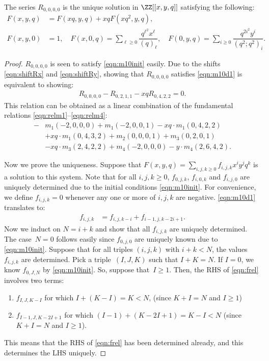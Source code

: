 \begin{thm}
The series $R_{0,0,0,0}$ is the unique solution in $\ZZ[[x,y,q]]$ satisfying
the following:
\begin{align}
F(x,y,q) &= F(xq,y,q) + xqF\left(xq^2,y,q\right) \label{eqn:m10d1},\\
F(x,y,0) &= 1,\quad 
F(x,0,q) = \sum_{\ell\geq 0}\dfrac{q^{\ell^2}x^\ell}{(q)_\ell},\quad 
F(0,y,q) = \sum_{i\geq 0}\dfrac{q^{2i^2}y^i}{(q^2;q^2)_i}. \label{eqn:m10init}
\end{align}
\end{thm}
\begin{proof}
$R_{0,0,0,0}$ is seen to satisfy \eqref{eqn:m10init} easily.
Due to the shifts \eqref{eqn:shiftRx} and \eqref{eqn:shiftRy}, showing that $R_{0,0,0,0}$ satisfies
\eqref{eqn:m10d1} is equivalent to showing:
\begin{align}
R_{0,0,0,0} - R_{0,2,1,1} - xqR_{0,4,2,2} = 0.
\end{align}
This relation can be obtained as a linear combination of the fundamental relations \eqref{eqn:relm1}--\eqref{eqn:relm4}:
\begin{align}
-&m_1(-2,0,0,0)+m_1(-2,0,0,1)-xq\cdot m_1(0,4,2,2)
\nonumber\\
&+xq\cdot m_1(0,4,3,2)+m_2(0,0,0,1)+m_3(0,2,0,1)
\nonumber \\
&-xq\cdot m_3(2,4,2,2)+m_4(-2,0,0,0)-y\cdot m_4(2,6,4,2).
\end{align}

Now we prove the uniqueness. 
Suppose that $F(x,y,q)=\sum_{i,j,k\geq 0}f_{i,j,k}x^iy^jq^k$ is a solution to this system.
Note that for all $i,j,k\geq 0$, $f_{0,j,k}$, $f_{i,0,k}$ and $f_{i,j,0}$ 
are uniquely determined due to the initial conditions 
\eqref{eqn:m10init}.
For convenience, we define $f_{i,j,k}=0$ whenever any one or more of $i,j,k$ are negative.
\eqref{eqn:m10d1} translates to:
\begin{align}
f_{i,j,k}&=f_{i,j,k-i}+f_{i-1,j,k-2i+1}.
\label{eqn:frel}
\end{align}
Now we induct on $N=i+k$ and show that all $f_{i,j,k}$ are uniquely determined.
The case~$N=0$ follows easily since $f_{0,j,0}$ are uniquely known due to \eqref{eqn:m10init}.
Suppose that for all triples $(i,j,k)$ with $i+k<N$, the values $f_{i,j,k}$ are determined.
Pick a triple~$(I,J,K)$ such that $I+K=N$. 
If $I=0$, we know $f_{0,J,N}$ by \eqref{eqn:m10init}.
So, suppose that~$I\geq 1$. 
Then, the RHS of \eqref{eqn:frel} involves two terms:
\begin{enumerate}
\item $f_{I,J,K-I}$ for which $I+(K-I) = K < N$, (since $K+I=N$ and $I\geq 1$)
\item $f_{I-1,J,K-2I+1}$ for which $(I-1)+(K-2I+1) = K - I < N$ (since $K+I=N$ and $I\geq 1$).
\end{enumerate}
This means that the RHS of \eqref{eqn:frel} has been determined already, and this determines
the LHS uniquely.
\end{proof}


